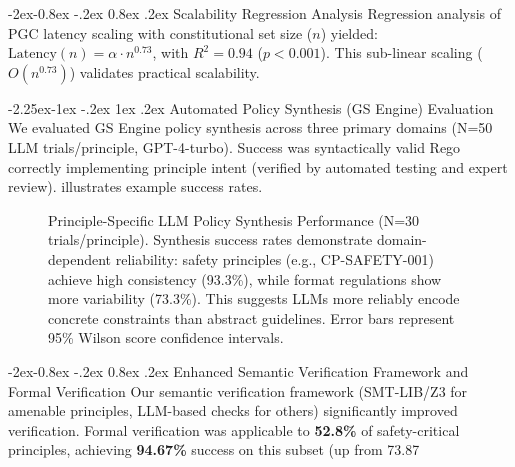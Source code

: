 \documentclass[manuscript,screen,9pt]{acmart}
\makeatletter
\renewcommand\subsection{\@startsection{subsection}{2}{\z@}%
  {-2.25ex\@plus -1ex \@minus -.2ex}%
  {1ex \@plus .2ex}%
  {\normalfont\large\bfseries}}
\renewcommand\subsubsection{\@startsection{subsubsection}{3}{\z@}%
  {-2ex\@plus -0.8ex \@minus -.2ex}%
  {0.8ex \@plus .2ex}%
  {\normalfont\normalsize\bfseries}}
\makeatother
\begin{document}
\begin{table}[!htb]
\subsubsection{Scalability Regression Analysis}
\label{subsubsec:scalability_regression_analysis}
Regression analysis of PGC latency scaling with constitutional set size ($n$) yielded: $\text{Latency}(n) = \alpha \cdot n^{0.73}$, with $R^2 = 0.94$ ($p < 0.001$). This sub-linear scaling ($O(n^{0.73})$) validates practical scalability.

\subsection{Automated Policy Synthesis (GS Engine) Evaluation}
\label{sec:synthesis_evaluation}
We evaluated GS Engine policy synthesis across three primary domains (N=50 LLM trials/principle, GPT-4-turbo). Success was syntactically valid Rego correctly implementing principle intent (verified by automated testing and expert review).  illustrates example success rates.

\FloatBarrier %
\begin{figure}[!htb]
\centering
\caption[Principle-Specific LLM Policy Synthesis Performance]{Principle-Specific LLM Policy Synthesis Performance (N=30 trials/principle). Synthesis success rates demonstrate domain-dependent reliability: safety principles (e.g., CP-SAFETY-001) achieve high consistency (93.3\%), while format regulations show more variability (73.3\%). This suggests LLMs more reliably encode concrete constraints than abstract guidelines. Error bars represent 95\% Wilson score confidence intervals.}
\label{fig:rule_synthesis_chart}
\end{figure}

\subsubsection{Enhanced Semantic Verification Framework and Formal Verification}
\label{subsubsec:enhanced_verification}
Our semantic verification framework (SMT-LIB/Z3 for amenable principles, LLM-based checks for others) significantly improved verification. Formal verification was applicable to \textbf{52.8\%} of safety-critical principles, achieving \textbf{94.67\%} success on this subset (up from 73.87%


\end{table}
\end{document}
